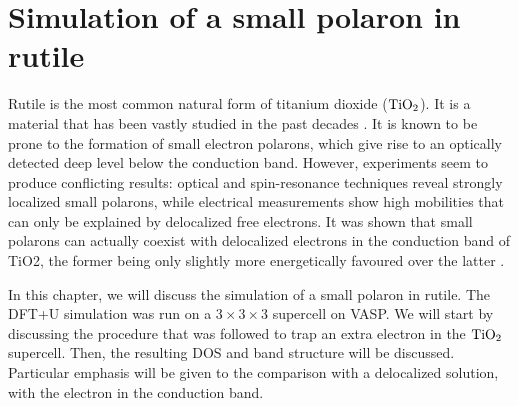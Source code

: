 \chapter{Simulation of a small polaron in rutile} \label{ch:simulation}
Rutile is the most common natural form of titanium dioxide ($\ce{TiO_2}$). It is a material that has been vastly studied in the past decades \cite{franchini2021b}. It is known to be prone to the formation of small electron polarons, which give rise to an optically detected deep level below the conduction band. However, experiments seem to produce conflicting results: optical and spin-resonance techniques reveal strongly localized small polarons, while electrical measurements show high mobilities that can only be explained by delocalized free electrons. It was shown that small polarons can actually coexist with delocalized electrons in the conduction band of TiO2, the former being only slightly more energetically favoured over the latter \cite{janotti2013}.

In this chapter, we will discuss the simulation of a small polaron in rutile. The DFT+U simulation was run on a $3\times3\times3$ supercell on VASP. We will start by discussing the procedure that was followed to trap an extra electron in the $\ce{TiO_2}$ supercell. Then, the resulting DOS and band structure will be discussed. Particular emphasis will be given to the comparison with a delocalized solution, with the electron in the conduction band.



